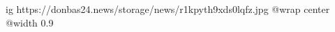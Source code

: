  
 
 
 
 

\ifcmt
  ig https://donbas24.news/storage/news/r1kpyth9xds0lqfz.jpg
  @wrap center
  @width 0.9
\fi
